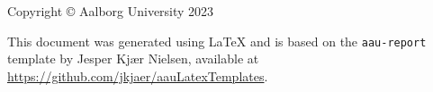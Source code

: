 \thispagestyle{empty}
{\small
\strut\vfill %
\noindent Copyright \copyright{} Aalborg University 2023\par
\vspace{0.2cm}
\noindent This document was generated using \LaTeX{} and is based on the \texttt{aau-report} template by Jesper Kjær Nielsen, available at \url{https://github.com/jkjaer/aauLatexTemplates}.
}
\clearpage